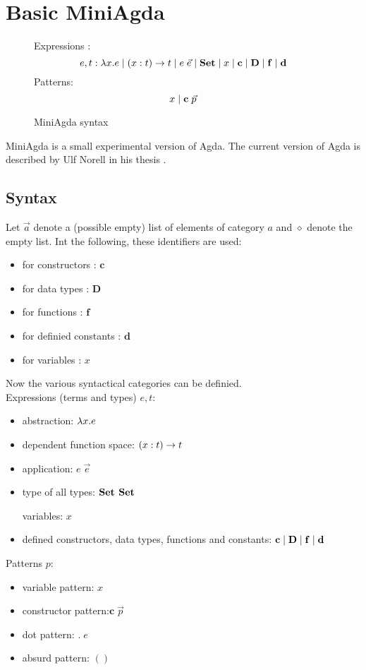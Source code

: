 \chapter{Basic MiniAgda}

\newcommand{\dd}{\mathbf{d}}
\newcommand{\DD}{\mathbf{D}}
\newcommand{\cc}{\mathbf{c}}
\newcommand{\ff}{\mathbf{f}}

\begin{figure}
\caption{MiniAgda syntax}
Expressions : \[e,t :  \lam x . e \vsp \EPi{x}{t}{t} \vsp e \; \vec{e} \vsp  \Set \vsp x \vsp \cc \vsp \DD \vsp \ff \vsp \dd\]
Patterns: \[ x  \vsp \cc \; \vec{p} \]
\end{figure}

MiniAgda is a small experimental version of Agda.
The current version of Agda is described by Ulf Norell in his thesis \cite{norell:thesis}.
\section{Syntax}
Let $\vec{a}$ denote a (possible empty) list of elements of category $a$
and $\diamond$ denote the empty list.
Int the following, these identifiers are used:
\begin{itemize}
\item for constructors : $\cc$ 
\item for data types : $\DD$
\item for functions : $\ff$
\item for definied constants : $\dd$
\item for variables : $x$
\end{itemize}
Now the various syntactical categories can be definied.
\\
Expressions (terms and types) $e,t$:  
\begin{itemize}
\item
abstraction: $ \lambda x . e $ 
\item
dependent function space: $( x : t ) \rightarrow t$ 
\item 
application: $ e \; \vec{e} $ 
\item
type of all types: $ \mathbf{Set} $  $ \mathbf{Set} $ 

variables: $x$
\item
defined constructors, data types, functions and constants:
$ \cc \vsp \DD \vsp \ff \vsp \dd$
\end{itemize}
Patterns $p$:
\begin{itemize}
\item
variable pattern: $x$ 
\item
constructor pattern:$ \cc \; \vec{p} $ 
\item
dot pattern: $ . \; e $ 
\item
absurd pattern: $()$
\end{itemize}
